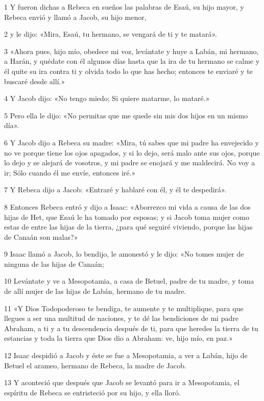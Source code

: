 \par 1 Y fueron dichas a Rebeca en sueños las palabras de Esaú, su hijo mayor, y Rebeca envió y llamó a Jacob, su hijo menor,
\par 2 y le dijo: «Mira, Esaú, tu hermano, se vengará de ti y te matará».
\par 3 «Ahora pues, hijo mío, obedece mi voz, levántate y huye a Labán, mi hermano, a Harán, y quédate con él algunos días hasta que la ira de tu hermano se calme y él quite su ira contra ti y olvida todo lo que has hecho; entonces te enviaré y te buscaré desde allí.»
\par 4 Y Jacob dijo: «No tengo miedo; Si quiere matarme, lo mataré.»
\par 5 Pero ella le dijo: «No permitas que me quede sin mis dos hijos en un mismo día».
\par 6 Y Jacob dijo a Rebeca su madre: «Mira, tú sabes que mi padre ha envejecido y no ve porque tiene los ojos apagados, y si lo dejo, será malo ante sus ojos, porque lo dejo y se alejará de vosotros, y mi padre se enojará y me maldecirá. No voy a ir; Sólo cuando él me envíe, entonces iré.»
\par 7 Y Rebeca dijo a Jacob: «Entraré y hablaré con él, y él te despedirá».
\par 8 Entonces Rebeca entró y dijo a Isaac: «Aborrezco mi vida a causa de las dos hijas de Het, que Esaú le ha tomado por esposas; y si Jacob toma mujer como estas de entre las hijas de la tierra, ¿para qué seguiré viviendo, porque las hijas de Canaán son malas?»
\par 9 Isaac llamó a Jacob, lo bendijo, le amonestó y le dijo: «No tomes mujer de ninguna de las hijas de Canaán;
\par 10 Levántate y ve a Mesopotamia, a casa de Betuel, padre de tu madre, y toma de allí mujer de las hijas de Labán, hermano de tu madre.
\par 11 «Y Dios Todopoderoso te bendiga, te aumente y te multiplique, para que llegues a ser una multitud de naciones, y te dé las bendiciones de mi padre Abraham, a ti y a tu descendencia después de ti, para que heredes la tierra de tu estancias y toda la tierra que Dios dio a Abraham: ve, hijo mío, en paz.»
\par 12 Isaac despidió a Jacob y éste se fue a Mesopotamia, a ver a Labán, hijo de Betuel el arameo, hermano de Rebeca, la madre de Jacob.
\par 13 Y aconteció que después que Jacob se levantó para ir a Mesopotamia, el espíritu de Rebeca se entristeció por su hijo, y ella lloró.
